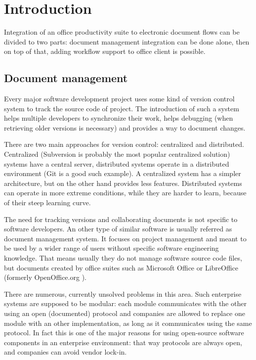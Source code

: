 \chapter{Introduction}

Integration of an office productivity suite to electronic document flows can be
divided to two parts: document management integration can be done alone, then
on top of that, adding workflow support to office client is possible.

\section{Document management}

Every major software development project uses some kind of version control
system to track the source code of project. The introduction of such a system
helps multiple developers to synchronize their work, helps debugging (when
retrieving older versions is necessary) and provides a way to document changes.

There are two main approaches for version control: centralized and distributed.
Centralized (Subversion \cite{subversion} is probably the most
popular centralized solution) systems have a central server, distributed
systems operate in a distributed environment (Git \cite{git} is a good such
example). A centralized system has a simpler architecture, but on the other
hand provides less features. Distributed systems can operate in more extreme
conditions, while they are harder to learn, because of their steep learning
curve.

The need for tracking versions and collaborating documents is not specific to
software developers. An other type of similar software is usually referred as
document management system. It focuses on project management and meant to be
used by a wider range of users without specific software engineering knowledge.
That means usually they do not manage software source code files, but documents
created by office suites such as Microsoft Office \cite{mso} or
LibreOffice \cite{lo} (formerly OpenOffice.org \cite{ooo}).

There are numerous, currently unsolved problems in this area. Such enterprise
systems are supposed to be modular: each module communicates with the other
using an open (documented) protocol and companies are allowed to replace one
module with an other implementation, as long as it communicates using the same
protocol. In fact this is one of the major reasons for using open-source
software components in an enterprise environment: that way protocols are always
open, and companies can avoid vendor lock-in.

